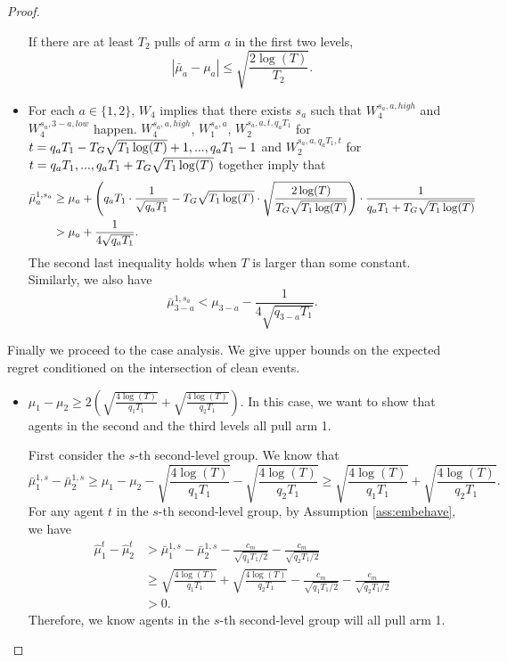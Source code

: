 \begin{proof}
\begin{itemize}
If there are at least $T_2$ pulls of arm $a$ in the first two levels, 
\[
|\bar{\mu}_a-\mu_a| \leq \sqrt{\frac{2\log(T)}{T_2}}. 
\]

\item For each $a \in \{1,2\}$, $W_4$ implies that there exists $s_a$ such that $W_4^{s_a,a,high}$ and $W_4^{s_a,3-a,low}$ happen. $W_4^{s_a,a,high}$,  $W_1^{s_a,a}$, $W_2^{s_a,a,t, q_aT_1}$ for $t = q_a T_1- T_G \sqrt{T_1\log(T)}+1, ...,q_aT_1-1$ and $W_2^{s_a,a,q_aT_1,t}$ for $t= q_aT_1,...,q_a T_1+ T_G \sqrt{T_1\log(T)}$ together imply that 
\begin{align*}
\bar{\mu}_a ^{1,s_a} &\geq \mu_a + \left(q_aT_1 \cdot \frac{1}{\sqrt{q_aT_1}} - T_G \sqrt{T_1\log(T)} \cdot \sqrt{\frac{2\log(T)}{ T_G \sqrt{T_1\log(T)}}} \right) \cdot \frac{1}{q_a T_1+ T_G \sqrt{T_1\log(T)}} \\
&> \mu_a + \frac{1}{4\sqrt{q_aT_1}}.
\end{align*}
The second last inequality holds when $T$ is larger than some constant.
Similarly, we also have
\[
\bar{\mu}_{3-a} ^{1,s_a} < \mu_{3-a}   - \frac{1}{4\sqrt{q_{3-a} T_1}}.
\]
\end{itemize}

Finally we proceed to the case analysis. We give upper bounds on the expected regret conditioned on the intersection of clean events.

\begin{itemize}
\item $\mu_1 - \mu_2 \geq 2\left(\sqrt{\frac{4\log(T)}{q_1T_1}} 
+ \sqrt{\frac{4\log(T)}{q_2T_1}}\right)$. In this case, we want to show that agents in the second and the third levels all pull arm 1. 

First consider the $s$-th second-level group. We know that 
\[
\bar{\mu}_1^{1,s} - \bar{\mu}_2^{1,s} \geq \mu_1 -\mu_2 - \sqrt{\frac{4\log(T)}{q_1T_1}} - \sqrt{\frac{4\log(T)}{q_2T_1}} \geq  \sqrt{\frac{4\log(T)}{q_1T_1}} + \sqrt{\frac{4\log(T)}{q_2T_1}}.
\]
For any agent $t$ in the $s$-th second-level group, by Assumption \ref{ass:embehave}, we have
\begin{align*}
\hat{\mu}_1^t - \hat{\mu}_2^t &>\bar{\mu}_1^{1,s} - \bar{\mu}_2^{1,s} - \frac{c_m}{\sqrt{q_1T_1/2}} - \frac{c_m}{\sqrt{q_2T_1/2}}\\
&\geq  \sqrt{\frac{4\log(T)}{q_1T_1}} + \sqrt{\frac{4\log(T)}{q_2T_1}}- \frac{c_m}{\sqrt{q_1T_1/2}} - \frac{c_m}{\sqrt{q_2T_1/2}}\\
 &> 0.
\end{align*}
Therefore, we know agents in the $s$-th second-level group will all pull arm 1.


\end{itemize}
\end{proof}

